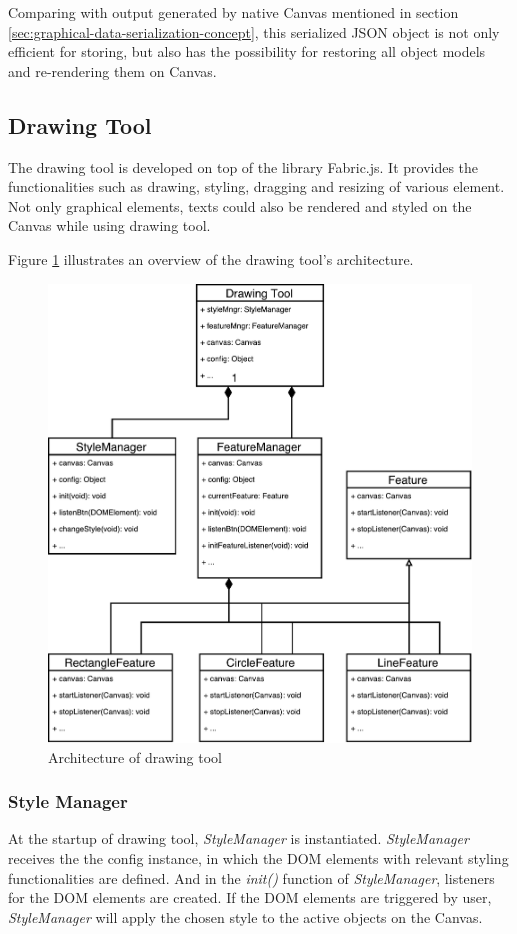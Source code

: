 Comparing with output generated by native Canvas mentioned in section \ref{sec:graphical-data-serialization-concept}, this serialized JSON object is not only efficient for storing, but also has the possibility for restoring all object models and re-rendering them on Canvas.

\subsection{Drawing Tool}
The drawing tool is developed on top of the library Fabric.js. It provides the functionalities such as drawing, styling, dragging and resizing of various element. Not only graphical elements, texts could also be rendered and styled on the Canvas while using drawing tool.

Figure \ref{fig:drawing-tool-arch-imp} illustrates an overview of the drawing tool's architecture. 

\begin{figure}[!htbp]
  \centering
    \includegraphics[width=1\textwidth]{Figures/imp-drawing-tool-arch.pdf}
  \caption{Architecture of drawing tool}
  \label{fig:drawing-tool-arch-imp}
\end{figure}

\subsubsection{Style Manager}
At the startup of drawing tool, \textit{StyleManager} is instantiated. \textit{StyleManager} receives the the config instance, in which the DOM elements with relevant styling functionalities are defined. And in the \textit{init()} function of \textit{StyleManager}, listeners for the DOM elements are created. If the DOM elements are triggered by user, \textit{StyleManager} will apply the chosen style to the active objects on the Canvas.

